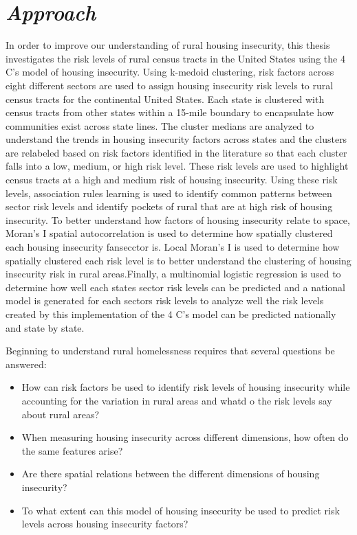 \section{\textit{Approach}}
In order to improve our understanding of rural housing insecurity, this thesis investigates the risk levels of rural census tracts in the United States  using the 4 C's model of housing insecurity. Using k-medoid clustering, risk factors across eight different sectors are used to assign housing insecurity risk levels to rural census tracts for the continental United States. Each state is clustered with census tracts from other states within a 15-mile boundary to encapsulate how communities exist across state lines. The cluster medians are analyzed to understand the trends in housing insecurity factors across states and the clusters are relabeled based on risk factors identified in the literature so that each cluster falls into a low, medium, or high risk level. These risk levels are used to highlight census tracts at a high and medium risk of housing insecurity. Using these risk levels, association rules learning is used to identify common patterns between sector risk levels and identify pockets of rural \ct that are at high risk of housing insecurity. To better understand how factors of housing insecurity relate to space, Moran's I spatial autocorrelation is used to determine how spatially clustered each housing insecurity fansecctor is. Local Moran's I is used to determine how spatially clustered each risk level is to better understand the clustering of housing insecurity risk in rural areas.Finally, a multinomial logistic regression is used to determine how well each states sector risk levels can be predicted and a national model is generated for each sectors risk levels to analyze well the risk levels created by this implementation of the 4 C's model can be predicted nationally and state by state. 

Beginning to understand rural homelessness requires that several questions be answered:
\begin{itemize}
    \item How can risk factors be used to identify risk levels of housing insecurity while accounting for the variation in rural areas and whatd o the risk levels say about rural areas?
    \item When measuring housing insecurity across different dimensions, how often do the same features arise?
    \item Are there spatial relations between the different dimensions of housing insecurity? 
    \item To what extent can this model of housing insecurity be used to predict risk levels across housing insecurity factors?


\end{itemize}
